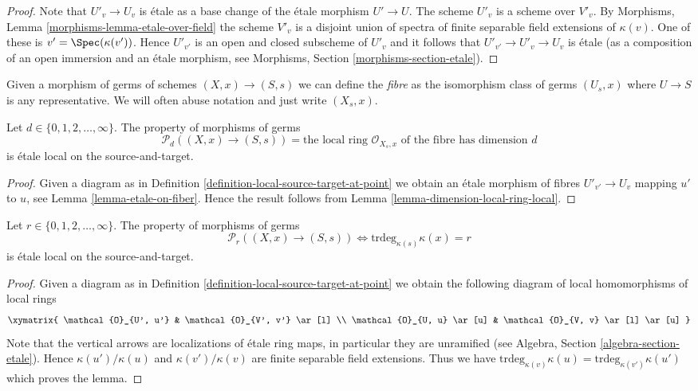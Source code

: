 \begin{proof}
Note that $U'_v \to U_v$ is \'etale as a base change of the \'etale
morphism $U' \to U$. The scheme $U'_v$ is a scheme over $V'_v$. By
Morphisms, Lemma \ref{morphisms-lemma-etale-over-field}
the scheme $V'_v$ is a disjoint union of spectra
of finite separable field extensions of $\kappa(v)$.
One of these is $v' = \Spec(\kappa(v'))$. Hence
$U'_{v'}$ is an open and closed subscheme of $U'_v$ and it follows
that $U'_{v'} \to U'_v \to U_v$ is \'etale (as a composition of an
open immersion and an \'etale morphism, see
Morphisms, Section \ref{morphisms-section-etale}).
\end{proof}

\noindent
Given a morphism of germs of schemes $(X, x) \to (S, s)$
we can define the {\it fibre} as the isomorphism class of germs
$(U_s, x)$ where $U \to S$ is any representative. We will often abuse notation
and just write $(X_s, x)$.

\begin{lemma}
\label{lemma-dimension-local-ring-fibre}
Let $d \in \{0, 1, 2, \ldots, \infty\}$.
The property of morphisms of germs
$$
\mathcal{P}_d((X, x) \to (S, s)) =
\text{the local ring }
\mathcal{O}_{X_s, x}
\text{ of the fibre has dimension }d
$$
is \'etale local on the source-and-target.
\end{lemma}

\begin{proof}
Given a diagram as in
Definition \ref{definition-local-source-target-at-point}
we obtain an \'etale morphism of fibres
$U'_{v'} \to U_v$ mapping $u'$ to $u$, see
Lemma \ref{lemma-etale-on-fiber}.
Hence the result follows from
Lemma \ref{lemma-dimension-local-ring-local}.
\end{proof}

\begin{lemma}
\label{lemma-transcendence-degree-at-point}
Let $r \in \{0, 1, 2, \ldots, \infty\}$.
The property of morphisms of germs
$$
\mathcal{P}_r((X, x) \to (S, s))
\Leftrightarrow
\text{trdeg}_{\kappa(s)} \kappa(x) = r
$$
is \'etale local on the source-and-target.
\end{lemma}

\begin{proof}
Given a diagram as in
Definition \ref{definition-local-source-target-at-point}
we obtain the following diagram of local homomorphisms of local rings
$$
\xymatrix{
\mathcal{O}_{U', u'} & \mathcal{O}_{V', v'} \ar[l] \\
\mathcal{O}_{U, u} \ar[u] & \mathcal{O}_{V, v} \ar[l] \ar[u]
}
$$
Note that the vertical arrows are localizations of \'etale ring maps,
in particular they are unramified (see
Algebra, Section \ref{algebra-section-etale}).
Hence $\kappa(u')/\kappa(u)$ and $\kappa(v')/\kappa(v)$
are finite separable field extensions.
Thus we have
$\text{trdeg}_{\kappa(v)} \kappa(u) = \text{trdeg}_{\kappa(v')} \kappa(u')$
which proves the lemma.
\end{proof}

